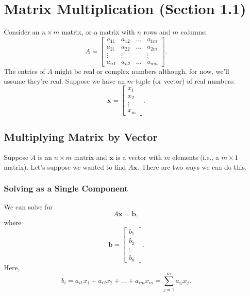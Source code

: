 \documentclass[letterpaper]{article}
\begin{document}
\section{Matrix Multiplication (Section 1.1)}
Consider an $n \times m$ matrix, or a matrix with $n$ rows and $m$ columns:
\[
    A = \begin{bmatrix}
        a_{11} & a_{12} & \hdots & a_{1m} \\ 
        a_{21} & a_{22} & \hdots & a_{2m} \\ 
        \vdots & \vdots &        & \vdots \\ 
        a_{n1} & a_{n2} & \hdots & a_{nm}
    \end{bmatrix}.
\]
The entries of $A$ might be real or complex numbers although, for now, we'll assume they're real. Suppose we have an $m$-tuple (or vector) of real numbers: 
\[\mathbf{x} = \begin{bmatrix}
    x_1 \\ x_2 \\ \vdots \\ x_m
\end{bmatrix}.\]

\subsection{Multiplying Matrix by Vector}
Suppose $A$ is an $n \times \boxed{m}$ matrix and $\mathbf{x}$ is a vector with $m$ elements (i.e., a $\boxed{m} \times 1$ matrix). Let's suppose we wanted to find $A\mathbf{x}$. There are two ways we can do this. 

\subsubsection{Solving as a Single Component}
We can solve for
\[A\mathbf{x} = \mathbf{b},\]
where 
\[\mathbf{b} = \begin{bmatrix}
    b_1 \\ b_2 \\ \vdots \\ b_n
\end{bmatrix}.\]
Here, 
\[b_i = a_{i1} x_1 + a_{i2} x_2 + \hdots + a_{im} x_{m} = \sum_{j = 1}^{m} a_{ij} x_j.\]
\end{document}
